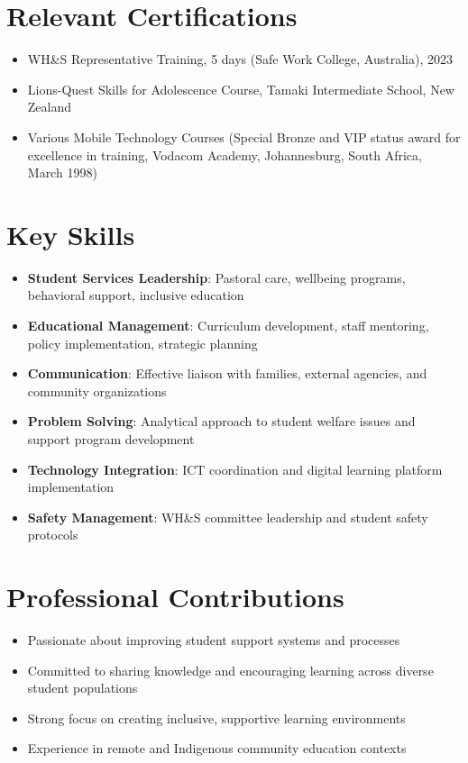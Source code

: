 \documentclass[11pt,a4paper]{article}
\begin{document}
\section*{Relevant Certifications}
\begin{itemize}
    \item WH\&S Representative Training, 5 days (Safe Work College, Australia), 2023
    \item Lions-Quest Skills for Adolescence Course, Tamaki Intermediate School, New Zealand
    \item Various Mobile Technology Courses (Special Bronze and VIP status award for excellence in training, Vodacom Academy, Johannesburg, South Africa, March 1998)
\end{itemize}

\section*{Key Skills}
\begin{itemize}
    \item \textbf{Student Services Leadership}: Pastoral care, wellbeing programs, behavioral support, inclusive education
    \item \textbf{Educational Management}: Curriculum development, staff mentoring, policy implementation, strategic planning
    \item \textbf{Communication}: Effective liaison with families, external agencies, and community organizations
    \item \textbf{Problem Solving}: Analytical approach to student welfare issues and support program development
    \item \textbf{Technology Integration}: ICT coordination and digital learning platform implementation
    \item \textbf{Safety Management}: WH\&S committee leadership and student safety protocols
\end{itemize}

\section*{Professional Contributions}
\begin{itemize}
    \item Passionate about improving student support systems and processes
    \item Committed to sharing knowledge and encouraging learning across diverse student populations
    \item Strong focus on creating inclusive, supportive learning environments
    \item Experience in remote and Indigenous community education contexts
\end{itemize}
\end{document}
